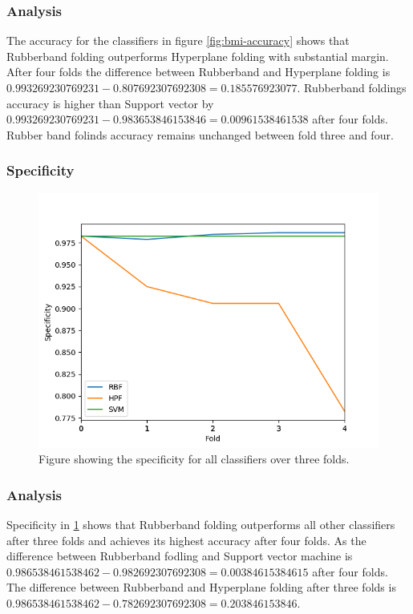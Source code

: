 \documentclass[a4paper,twoside]{bth}
\begin{document}
\FloatBarrier

\subsubsection{Analysis}
The accuracy for the classifiers in figure \ref{fig:bmi-accuracy} shows that Rubberband folding outperforms Hyperplane folding with substantial margin. After four folds the difference between Rubberband and Hyperplane folding is $0.993269230769231 - 0.807692307692308 = 0.185576923077$. Rubberband foldings accuracy is higher than Support vector by $0.993269230769231 - 0.983653846153846 = 0.00961538461538$ after four folds. Rubber band folinds accuracy remains unchanged between fold three and four. 

\clearpage
\FloatBarrier

\subsubsection{Specificity}
\begin{figure}[!htb]
\centering
\includegraphics[scale=0.7]{images/result-bmi/Specificity.png}
   \caption{Figure showing the specificity for all classifiers over three folds.}
   \label{fig:bmi-Specificty}
\end{figure}

\FloatBarrier

\subsubsection{Analysis}
Specificity  in \ref{fig:bmi-Specificty} shows that Rubberband folding outperforms all other classifiers after three folds and achieves its highest accuracy after four folds. As the difference between Rubberband fodling and Support vector machine is $0.986538461538462 - 0.982692307692308 = 0.00384615384615$ after four folds. The difference between Rubberband and Hyperplane folding after three folds is $0.986538461538462 - 0.782692307692308 = 0.203846153846$.
\end{document}
